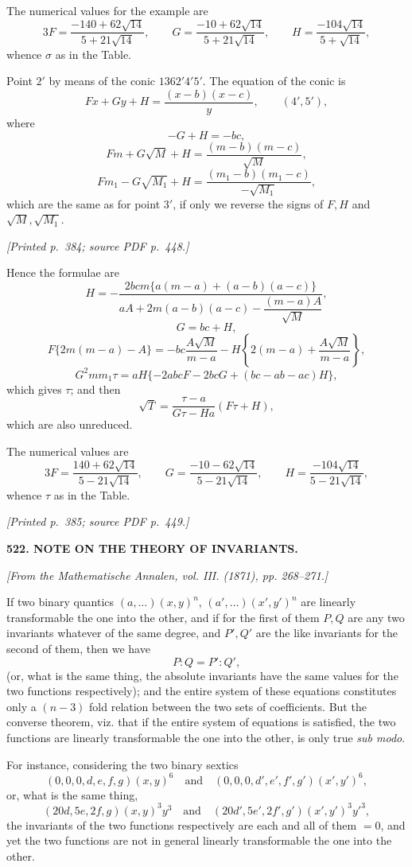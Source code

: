 \documentclass[11pt,a4paper]{article}
\newcommand{\sourcepage}[2]{\par\smallskip\noindent\textit{[Printed p.~#1; source PDF p.~#2.]}\par\smallskip}
\newcommand{\articlenote}[1]{\begin{center}\small\textit{#1}\end{center}}
\begin{document}
The numerical values for the example are
\[
3F=\frac{-140+62\sqrt{14}}{5+21\sqrt{14}},\qquad
G=\frac{-10+62\sqrt{14}}{5+21\sqrt{14}},\qquad
H=\frac{-104\sqrt{14}}{5+\sqrt{14}},
\]
whence $\sigma$ as in the Table.

Point $2'$ by means of the conic $1362'4'5'$. The equation of the conic is
\[
Fx+Gy+H=\frac{(x-b)(x-c)}{y},\qquad (4',5'),
\]
where
\[
-G+H=-bc,\tag{3}
\]
\[
Fm+G\sqrt M+H=\frac{(m-b)(m-c)}{\sqrt M},\tag{1}
\]
\[
Fm_1-G\sqrt{M_1}+H=\frac{(m_1-b)(m_1-c)}{-\sqrt{M_1}},\tag{6}
\]
which are the same as for point $3'$, if only we reverse the signs of
$F,H$ and $\sqrt M,\sqrt{M_1}$.

\sourcepage{384}{448}
Hence the formulae are
\[
H=-\frac{2bcm\{a(m-a)+(a-b)(a-c)\}}
{aA+2m(a-b)(a-c)-\dfrac{(m-a)A}{\sqrt M}},
\]
\[
G=bc+H,
\]
\[
F\{2m(m-a)-A\}
=-bc\frac{A\sqrt M}{m-a}
-H\left\{2(m-a)+\frac{A\sqrt M}{m-a}\right\},
\]
\[
G^2mm_1\tau
=aH\{-2abcF-2bcG+(bc-ab-ac)H\},
\]
which gives $\tau$; and then
\[
\sqrt T=\frac{\tau-a}{G\tau-Ha}(F\tau+H),
\]
which are also unreduced.

The numerical values are
\[
3F=\frac{140+62\sqrt{14}}{5-21\sqrt{14}},\qquad
G=\frac{-10-62\sqrt{14}}{5-21\sqrt{14}},\qquad
H=\frac{-104\sqrt{14}}{5-21\sqrt{14}},
\]
whence $\tau$ as in the Table.

\sourcepage{385}{449}
\begin{center}
{\large\bfseries 522. NOTE ON THE THEORY OF INVARIANTS.}
\end{center}
\articlenote{[From the Mathematische Annalen, vol. III. (1871), pp. 268--271.]}

If two binary quantics $(a,\ldots)(x,y)^n$, $(a',\ldots)(x',y')^n$ are linearly
transformable the one into the other, and if for the first of them $P,Q$ are any two
invariants whatever of the same degree, and $P',Q'$ are the like invariants for the
second of them, then we have
\[
P:Q=P':Q',
\]
(or, what is the same thing, the absolute invariants have the same values for the two
functions respectively); and the entire system of these equations constitutes only a
$(n-3)$ fold relation between the two sets of coefficients. But the converse theorem,
viz. that if the entire system of equations is satisfied, the two functions are linearly
transformable the one into the other, is only true \textit{sub modo}.

For instance, considering the two binary sextics
\[
(0,0,0,d,e,f,g)(x,y)^6
\quad\text{and}\quad
(0,0,0,d',e',f',g')(x',y')^6,
\]
or, what is the same thing,
\[
(20d,5e,2f,g)(x,y)^3y^3
\quad\text{and}\quad
(20d',5e',2f',g')(x',y')^3y'^3,
\]
the invariants of the two functions respectively are each and all of them $=0$, and
yet the two functions are not in general linearly transformable the one into the other.
\end{document}
